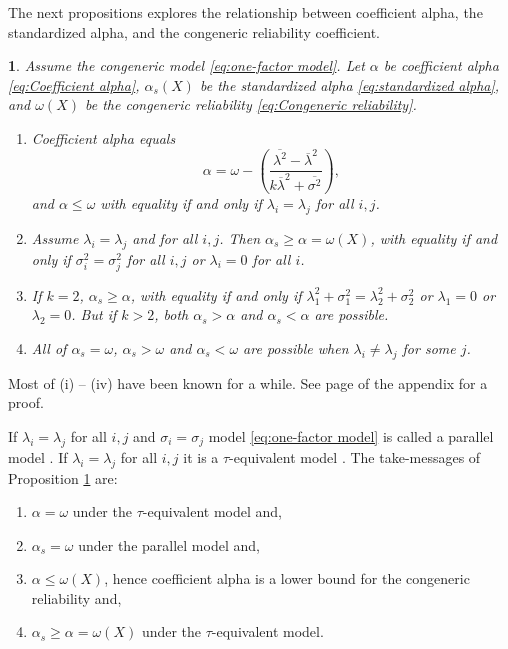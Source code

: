 \documentclass{article}
\makeatletter
\theoremstyle{plain}
\theoremstyle{plain}
\theoremstyle{definition}
\theoremstyle{remark}
\theoremstyle{definition}
\theoremstyle{plain}
\theoremstyle{plain}
\newtheorem{prop}[thm]{\protect\propositionname}
\theoremstyle{definition}
\newenvironment{proof}[1][\protect\proofname]{\par
	\normalfont\topsep6\p@\@plus6\p@\relax
	\trivlist
	\itemindent\parindent
	\item[\hskip\labelsep\scshape #1]\ignorespaces
}{%
	\endtrivlist\@endpefalse
}
\providecommand{\proofname}{Proof}
\providecommand{\propositionname}{Proposition}
\makeatother
\begin{document}
The next propositions explores the relationship between coefficient alpha, the standardized alpha, and the congeneric reliability coefficient.

\begin{prop}
\label{prop:Reliabilities.}Assume the congeneric model \eqref{eq:one-factor model}. Let $\alpha$ be coefficient alpha \eqref{eq:Coefficient alpha}, $\alpha_{s}(X)$ be the standardized alpha \eqref{eq:standardized alpha}, and  $\omega(X)$ be the congeneric reliability \eqref{eq:Congeneric reliability}. 
\begin{enumerate}[label=(\roman*)]
\item Coefficient alpha equals $$\alpha=\omega-\left(\frac{\overline{\lambda^{2}}-\overline{\lambda}^{2}}{k\overline{\lambda}^{2}+\overline{\sigma^{2}}}\right),$$
and $\alpha\leq\omega$ with equality
if and only if $\lambda_{i}=\lambda_{j}$ for all $i,j$.
\item Assume $\lambda_{i}=\lambda_{j}$ and for all $i,j$. Then $\alpha_s \geq \alpha = \omega(X)$, with equality if and only if $\sigma_{i}^{2}=\sigma_{j}^{2}$ for all $i,j$ or $\lambda_i = 0$ for all $i$.
\item If $k=2$, $\alpha_s\geq\alpha$, with equality if and only if $\lambda_{1}^{2}+\sigma_{1}^{2}=\lambda_{2}^{2}+\sigma_{2}^{2}$ or $\lambda_1 = 0$ or $\lambda_2 = 0$. But if $k>2$, both $\alpha_s>\alpha$
and $\alpha_s<\alpha$ are possible.
\item All of $\alpha_{s}=\omega$, $\alpha_{s}>\omega$ and $\alpha_{s}<\omega$
are possible when $\lambda_{i}\neq\lambda_{j}$ for some $j$.
\end{enumerate}
\end{prop}
\begin{proof}
Most of (i) -- (iv) have been known for a while. See page \pageref{proof:Reliabilities.} of the appendix for a proof.
\end{proof}

If $\lambda_{i}=\lambda_{j}$ for all $i,j$ and $\sigma_{i}=\sigma_{j}$
model \eqref{eq:one-factor model} is called a parallel model \citep[][section 2.13]{Lord1968-ax}. If $\lambda_{i}=\lambda_{j}$
for all $i,j$ it is a $\tau$-equivalent model \citep[][section 2.13]{Lord1968-ax}. The take-messages of Proposition \ref{prop:Reliabilities.} are:

\begin{enumerate}[label=(\alph*)]
\item $\alpha = \omega$ under the $\tau$-equivalent model and,
\item $\alpha_s = \omega$ under the parallel model and,
\item $\alpha \leq \omega(X)$, hence coefficient alpha is a lower bound for the congeneric reliability and,
\item $\alpha_s \geq \alpha = \omega(X)$ under the $\tau$-equivalent model.
\end{enumerate}
\end{document}
